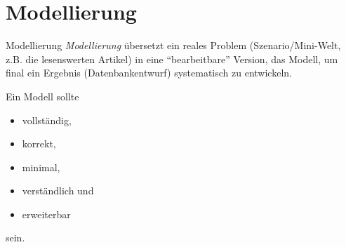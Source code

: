 \section{Modellierung}

\begin{defi}{Modellierung}
    \emph{Modellierung} übersetzt ein reales Problem (Szenario/Mini-Welt, z.B. die lesenswerten Artikel) in eine \enquote{bearbeitbare} Version, das Modell, um final ein Ergebnis (Datenbankentwurf) systematisch zu entwickeln.

    Ein Modell sollte
    \begin{itemize}
        \item vollständig,
        \item korrekt,
        \item minimal,
        \item verständlich und
        \item erweiterbar
    \end{itemize}
    sein.
\end{defi}

